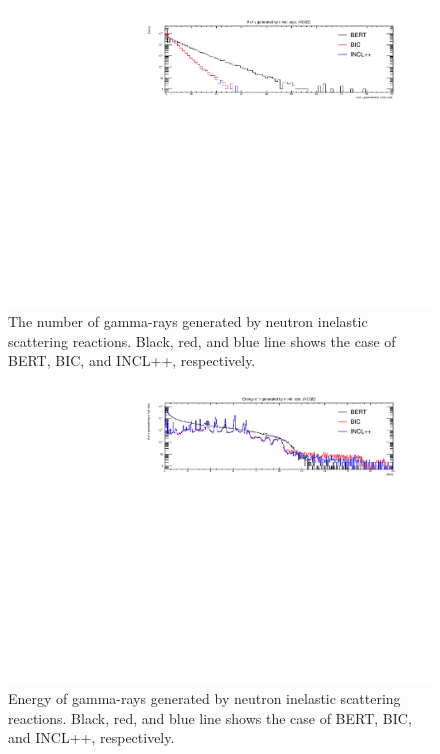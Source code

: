\begin{figure}[p]
	\centering
	\includegraphics[width=16cm]{PDF/Secondary/Comparison/onlyNCQE_gamma/pdf1/Logy_NumSec}
	\caption[The number of gamma-rays generated by neutron inelastic scattering reactions]{
	The number of gamma-rays generated by neutron inelastic scattering reactions.
	Black, red, and blue line shows the case of BERT, BIC, and INCL++, respectively.
	}\label{gamma_Logy_NumSec}
\end{figure}

\begin{figure}[p]
	\centering
	\includegraphics[width=16cm]{PDF/Secondary/Comparison/onlyNCQE_gamma/pdf1/Logy_EneSec}
	\caption[Energy of gamma-rays generated by neutron inelastic scattering reactions]{
	Energy of gamma-rays generated by neutron inelastic scattering reactions.
	Black, red, and blue line shows the case of BERT, BIC, and INCL++, respectively.
	}\label{gamma_Logy_EneSec}
\end{figure}

